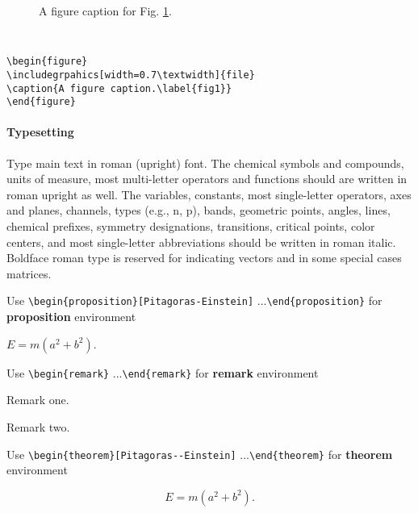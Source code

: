 \documentclass[CEJCS,PDF]{cej} %
\begin{document}
\begin{figure}
\caption{A figure caption for Fig. \ref{fig2}.\label{fig2}}
\end{figure}

{\tt
\begin{verbatim}
\begin{figure}
\includegrpahics[width=0.7\textwidth]{file}
\caption{A figure caption.\label{fig1}}
\end{figure}
\end{verbatim}
}

\paragraph{Typesetting}
    Type main text in roman (upright) font. The chemical symbols and compounds, units of measure, most multi-letter operators and functions should are written in roman upright as well. The variables, constants, most single-letter operators, axes and planes, channels, types (e.g., n, p), bands, geometric points, angles, lines, chemical prefixes, symmetry designations, transitions, critical points, color centers, and most single-letter abbreviations should be written in roman italic. Boldface roman type is reserved for indicating vectors and in some special cases matrices.

Use {\tt \verb+\begin{proposition}[Pitagoras-Einstein]+} ...{\tt \verb+\end{proposition}+} for {\bf proposition} environment
\begin{proposition}
$E=m(a^2+b^2)$.
\end{proposition}

Use {\tt \verb+\begin{remark}+} ...{\tt \verb+\end{remark}+} for {\bf remark} environment
\begin{remark}
Remark one.
\end{remark}

\begin{remark}
Remark two.
\end{remark}

Use {\tt \verb+\begin{theorem}[Pitagoras--Einstein]+} ...{\tt \verb+\end{theorem}+} for {\bf theorem} environment
\begin{theorem}
\begin{equation} E=m(a^2+b^2). \end{equation}
\end{theorem}
\end{document}
